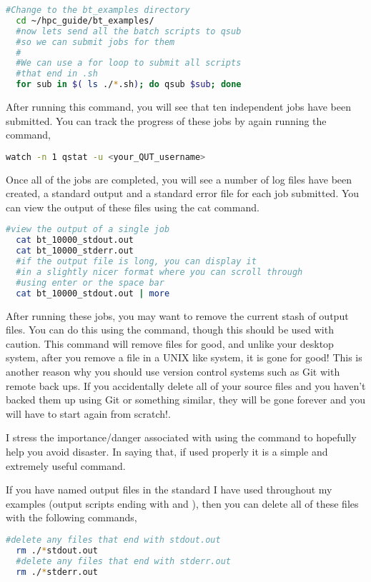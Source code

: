 \begin{lstlisting}[language=bash, frame=single]
  #Change to the bt_examples directory
  cd ~/hpc_guide/bt_examples/
  #now lets send all the batch scripts to qsub
  #so we can submit jobs for them
  #
  #We can use a for loop to submit all scripts
  #that end in .sh
  for sub in $( ls ./*.sh); do qsub $sub; done
\end{lstlisting}
% 
% 
After running this command, you will see that ten independent jobs have been submitted. You can track the progress of these jobs by again running the command,
\begin{lstlisting}[language=bash, frame=single]
  watch -n 1 qstat -u <your_QUT_username>
\end{lstlisting}
%
%
Once all of the jobs are completed, you will see a number of log files have been created, a standard output and a standard error file for each job submitted. You can view the output of these files using the cat command.
%
%
\newpage
\begin{lstlisting}[language=bash, frame=single]
  #view the output of a single job
  cat bt_10000_stdout.out
  cat bt_10000_stderr.out
  #if the output file is long, you can display it
  #in a slightly nicer format where you can scroll through
  #using enter or the space bar
  cat bt_10000_stdout.out | more
\end{lstlisting}
%
%
%
After running these jobs, you may want to remove the current stash of output files. You can do this using the  command, though this should be used with caution. This command will remove files for good, and unlike your desktop system, after you remove a file in a UNIX like system, it is gone for good! This is another reason why you should use version control systems such as Git with remote back ups. If you accidentally delete all of your source files and you haven't backed them up using Git or something similar, they will be gone forever and you will have to start again from scratch!.
%
%
\par
%
%
I stress the importance/danger associated with using the  command to hopefully help you avoid disaster. In saying that, if used properly it is a simple and extremely useful command.
%
%
\par
If you have named output files in the standard I have used throughout my examples (output scripts ending with  and ), then you can delete all of these files with the following commands,
%
\begin{lstlisting}[language=bash, frame=single]
  #delete any files that end with stdout.out
  rm ./*stdout.out
  #delete any files that end with stderr.out
  rm ./*stderr.out
\end{lstlisting}
%
%
%
%
%
